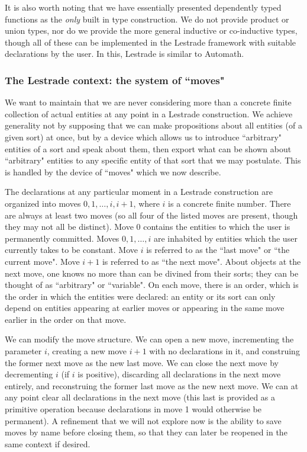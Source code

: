 \documentclass{article}
\begin{document}
It is also worth noting that we have essentially presented dependently typed functions as the {\em only\/} built in type construction.  We do not provide product or union types, nor do we provide the more general inductive or co-inductive types, though all of these can be implemented in the Lestrade framework with suitable declarations by the user.  In this, Lestrade is similar to Automath.

\subsubsection{The Lestrade context:  the system of ``moves"}

We want to maintain that we are never considering more than a concrete finite collection  of actual  entities at any point in a Lestrade construction.  We achieve generality not by supposing that we can make propositions about all entities (of a given sort) at once, but by a device which allows us to introduce
``arbitrary" entities of a sort and speak about them, then export what can be shown about ``arbitrary" entities to any specific entity of that sort that we may postulate.   This is handled by the device of ``moves" which we now describe.

The declarations at any particular moment in a Lestrade construction are organized into moves $0,1,\ldots,i,i+1$, where $i$ is a concrete finite number.
There are always at least two moves (so all four of the listed moves are present, though they may not all be distinct).  Move 0 contains the entities to which the user is permanently committed.  Moves $0,1,\ldots,i$ are inhabited by entities which the user currently takes to be constant.  Move $i$ is referred to as the ``last move" or ``the current move".  Move $i+1$ is referred to as ``the next move".   About objects at the next move, one knows no more than can be divined from their sorts;  they can be thought of as ``arbitrary" or ``variable".  On each move, there is an order, which is the order in which the entities were declared:  an entity or its sort can only depend on entities appearing at earlier moves or appearing in the same move earlier in the order on that move.


We can modify the move structure.  We can open a new move, incrementing the parameter $i$, creating a new move $i+1$ with no declarations in it,
and construing the former next move as the new last move.  We can close the next move by decrementing $i$ (if $i$ is positive), discarding all declarations in the next move entirely, and reconstruing the former last move as the new next move.  We can at any point clear all declarations in the next move
(this last is provided as a primitive operation because declarations in move 1 would otherwise be permanent).  A refinement that we will not explore now is the ability to save moves by name before closing them, so that they can later be reopened in the same context if desired.
\end{document}
